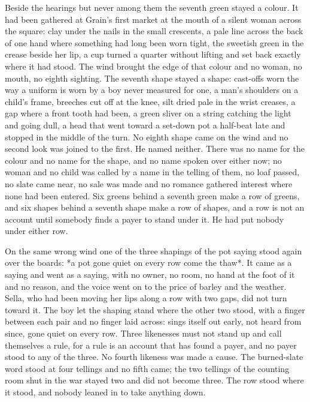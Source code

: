 Beside the hearings but never among them the seventh green stayed a colour. It had been gathered at Grain's first market at the mouth of a silent woman across the square: clay under the nails in the small crescents, a pale line across the back of one hand where something had long been worn tight, the sweetish green in the crease beside her lip, a cup turned a quarter without lifting and set back exactly where it had stood. The wind brought the edge of that colour and no woman, no mouth, no eighth sighting. The seventh shape stayed a shape: cast-offs worn the way a uniform is worn by a boy never measured for one, a man's shoulders on a child's frame, breeches cut off at the knee, silt dried pale in the wrist creases, a gap where a front tooth had been, a green sliver on a string catching the light and going dull, a head that went toward a set-down pot a half-beat late and stopped in the middle of the turn. No eighth shape came on the wind and no second look was joined to the first. He named neither. There was no name for the colour and no name for the shape, and no name spoken over either now; no woman and no child was called by a name in the telling of them, no loaf passed, no slate came near, no sale was made and no romance gathered interest where none had been entered. Six greens behind a seventh green make a row of greens, and six shapes behind a seventh shape make a row of shapes, and a row is not an account until somebody finds a payer to stand under it. He had put nobody under either row.

On the same wrong wind one of the three shapings of the pot saying stood again over the boards: *a pot gone quiet on every row come the thaw*. It came as a saying and went as a saying, with no owner, no room, no hand at the foot of it and no reason, and the voice went on to the price of barley and the weather. Sella, who had been moving her lips along a row with two gaps, did not turn toward it. The boy let the shaping stand where the other two stood, with a finger between each pair and no finger laid across: sings itself out early, not heard from since, gone quiet on every row. Three likenesses must not stand up and call themselves a rule, for a rule is an account that has found a payer, and no payer stood to any of the three. No fourth likeness was made a cause. The burned-slate word stood at four tellings and no fifth came; the two tellings of the counting room shut in the war stayed two and did not become three. The row stood where it stood, and nobody leaned in to take anything down.

